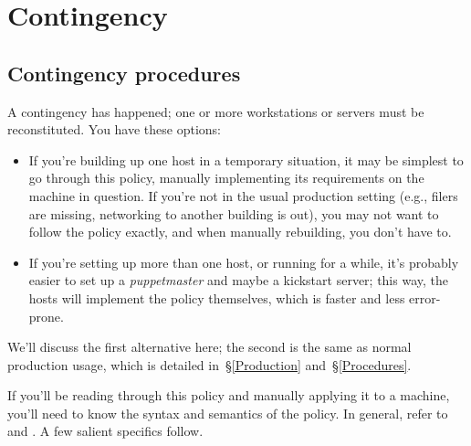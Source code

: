 %
%
%
\chapter{Contingency}
\label{Contingency}

\section{Contingency procedures}

A contingency has happened; one or more workstations or servers
must be reconstituted. You have these options:

\begin{itemize}

\item If you're building up one host in a temporary situation, it may be
simplest to go through this policy, manually implementing its requirements
on the machine in question. If you're not in the usual production setting
(e.g., filers are missing, networking to another building is out), you may
not want to follow the policy exactly, and when manually rebuilding, you
don't have to.

\item If you're setting up more than one host, or running for a while,
it's probably easier to set up a \emph{puppetmaster} and maybe a kickstart
server; this way, the hosts will implement the policy themselves, which is
faster and less error-prone.

\end{itemize}

We'll discuss the first alternative here; the second is the same as normal
production usage, which is detailed in~\S\ref{Production}
and~\S\ref{Procedures}.

If you'll be reading through this policy and manually applying it to a
machine, you'll need to know the syntax and semantics of the policy. In
general, refer to \cite{pro-puppet-book} and
\cite{puppet-generated-references}. A few salient specifics follow.

